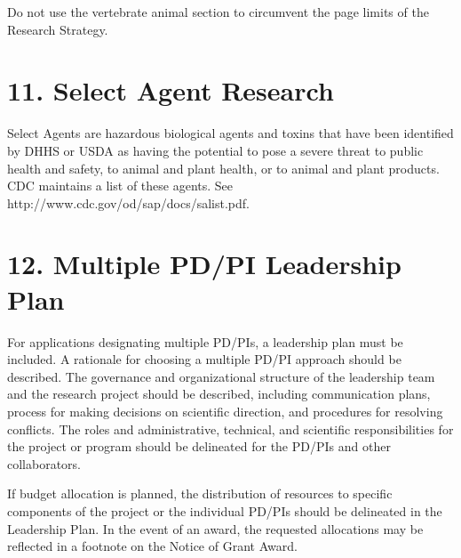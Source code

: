 \documentclass[11pt, notitlepage]{article} %
\begin{document}
Do not use the vertebrate animal section to circumvent the page limits of the Research Strategy.


\newpage

\section*{11. Select Agent Research}

Select Agents are hazardous biological agents and toxins that have been identified by DHHS or USDA as having the potential to pose a severe threat to public health and safety, to animal and plant health, or to animal and plant products. CDC maintains a list of these agents. See http://www.cdc.gov/od/sap/docs/salist.pdf.


\newpage

\section*{12. Multiple PD/PI Leadership Plan}

For applications designating multiple PD/PIs, a leadership plan must be included. A rationale for choosing a multiple PD/PI approach should be described. The governance and organizational structure of the leadership team and the research project should be described, including communication plans, process for making decisions on scientific direction, and procedures for resolving conflicts. The roles and administrative, technical, and scientific responsibilities for the project or program should be delineated for the PD/PIs and other collaborators.

If budget allocation is planned, the distribution of resources to specific components of the project or the individual PD/PIs should be delineated in the Leadership Plan. In the event of an award, the requested allocations may be reflected in a footnote on the Notice of Grant Award.

\end{document}
